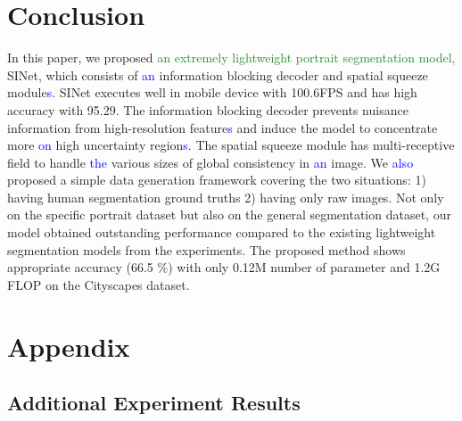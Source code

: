 \documentclass[10pt,twocolumn,letterpaper]{article}
\newcommand\Lars[1]{\textcolor{blue}{#1}}
\newcommand\yj[1]{\textcolor{ForestGreen}{#1}}
\newcommand\Lars[1]{#1}
\newcommand\yj[1]{#1}
\begin{document}
\label{city} \section{Conclusion}
In this paper, we proposed \yj{an extremely lightweight portrait segmentation model,} SINet, which consists of \Lars{an} information blocking decoder and spatial squeeze module\Lars{s}.
SINet executes well in mobile device with 100.6FPS and has high accuracy with 95.29.
The information blocking decoder prevents nuisance information from high-resolution feature\Lars{s} and induce the model to concentrate more \Lars{on} high uncertainty region\Lars{s}.
The spatial squeeze module has multi-receptive field to handle \Lars{the} various sizes of global consistency in \Lars{an} image.
We \Lars{also} proposed a simple data generation framework covering the two situations: 1) having human segmentation ground truths 2) having only raw images. 
Not only on the specific portrait dataset but also on the general segmentation dataset, our model obtained outstanding performance compared to the existing lightweight segmentation models from the experiments.
The proposed method shows appropriate accuracy (66.5 \%) with only 0.12M number of parameter and 1.2G FLOP on the Cityscapes dataset. 

\label{sec:endLOL} 
{\small


}

\newpage

\section*{Appendix}

\subsection*{Additional Experiment Results}
\label{latency}
\end{document}
